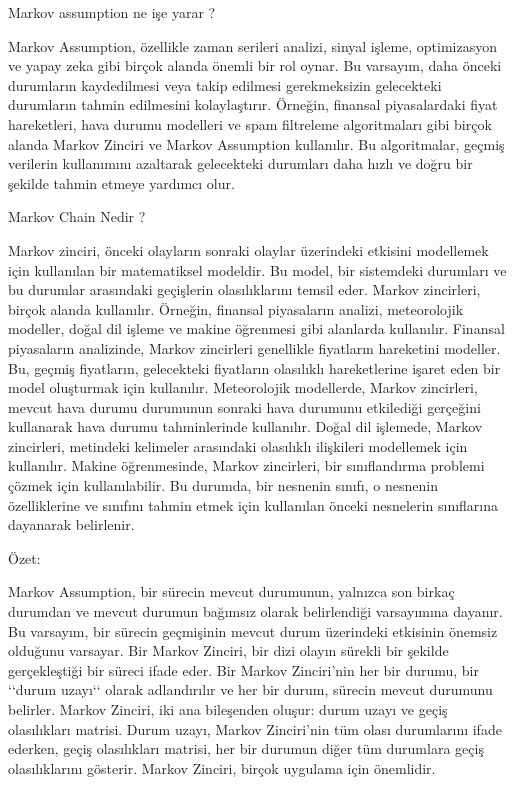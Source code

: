 \documentclass[11pt]{article}
\begin{document}
Markov assumption ne işe yarar ?

Markov Assumption, özellikle zaman serileri analizi, sinyal işleme, optimizasyon ve yapay zeka gibi birçok alanda önemli bir rol oynar. 
Bu varsayım, daha önceki durumların kaydedilmesi veya takip edilmesi gerekmeksizin gelecekteki durumların tahmin edilmesini kolaylaştırır.
Örneğin, finansal piyasalardaki fiyat hareketleri, hava durumu modelleri ve spam filtreleme algoritmaları gibi birçok alanda Markov Zinciri ve Markov Assumption kullanılır. 
Bu algoritmalar, geçmiş verilerin kullanımını azaltarak gelecekteki durumları daha hızlı ve doğru bir şekilde tahmin etmeye yardımcı olur.

Markov Chain Nedir ?

Markov zinciri, önceki olayların sonraki olaylar üzerindeki etkisini modellemek için kullanılan bir matematiksel modeldir. Bu model, bir sistemdeki durumları ve bu durumlar arasındaki geçişlerin olasılıklarını temsil eder.
Markov zincirleri, birçok alanda kullanılır. Örneğin, finansal piyasaların analizi, meteorolojik modeller, doğal dil işleme ve makine öğrenmesi gibi alanlarda kullanılır.
Finansal piyasaların analizinde, Markov zincirleri genellikle fiyatların hareketini modeller. Bu, geçmiş fiyatların, gelecekteki fiyatların olasılıklı hareketlerine işaret eden bir model oluşturmak için kullanılır.
Meteorolojik modellerde, Markov zincirleri, mevcut hava durumu durumunun sonraki hava durumunu etkilediği gerçeğini kullanarak hava durumu tahminlerinde kullanılır.
Doğal dil işlemede, Markov zincirleri, metindeki kelimeler arasındaki olasılıklı ilişkileri modellemek için kullanılır.
Makine öğrenmesinde, Markov zincirleri, bir sınıflandırma problemi çözmek için kullanılabilir. Bu durumda, bir nesnenin sınıfı,
o nesnenin özelliklerine ve sınıfını tahmin etmek için kullanılan önceki nesnelerin sınıflarına dayanarak belirlenir.

Özet:

Markov Assumption, bir sürecin mevcut durumunun, yalnızca son birkaç durumdan ve mevcut durumun bağımsız olarak belirlendiği varsayımına dayanır.
Bu varsayım, bir sürecin geçmişinin mevcut durum üzerindeki etkisinin önemsiz olduğunu varsayar.
Bir Markov Zinciri, bir dizi olayın sürekli bir şekilde gerçekleştiği bir süreci ifade eder.
Bir Markov Zinciri'nin her bir durumu, bir ‘‘durum uzayı‘‘ olarak adlandırılır ve her bir durum, sürecin mevcut durumunu belirler.
Markov Zinciri, iki ana bileşenden oluşur: durum uzayı ve geçiş olasılıkları matrisi.
Durum uzayı, Markov Zinciri'nin tüm olası durumlarını ifade ederken, geçiş olasılıkları matrisi, her bir durumun diğer tüm durumlara geçiş olasılıklarını gösterir.
Markov Zinciri, birçok uygulama için önemlidir.
\end{document}
